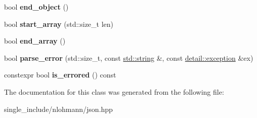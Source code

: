 \begin{DoxyCompactItemize}
\mbox{\label{classnlohmann_1_1detail_1_1json__sax__dom__callback__parser_ae75d313d6d1b9c29508e740a10fefa18}} 
bool {\bfseries end\+\_\+object} ()
\item 
\mbox{\label{classnlohmann_1_1detail_1_1json__sax__dom__callback__parser_a5255b98ba8282e3625968f91cff9d3d0}} 
bool {\bfseries start\+\_\+array} (std\+::size\+\_\+t len)
\item 
\mbox{\label{classnlohmann_1_1detail_1_1json__sax__dom__callback__parser_aa64e7a650952174037d32028de582c12}} 
bool {\bfseries end\+\_\+array} ()
\item 
\mbox{\label{classnlohmann_1_1detail_1_1json__sax__dom__callback__parser_aac6e64f0b59c9150cde974e182d5ecab}} 
bool {\bfseries parse\+\_\+error} (std\+::size\+\_\+t, const \hyperlink{namespacenlohmann_1_1detail_a1ed8fc6239da25abcaf681d30ace4985ab45cffe084dd3d20d928bee85e7b0f21}{std\+::string} \&, const \hyperlink{classnlohmann_1_1detail_1_1exception}{detail\+::exception} \&ex)
\item 
\mbox{\label{classnlohmann_1_1detail_1_1json__sax__dom__callback__parser_a167fd9bf385d3d08bcbbba8a927c0eff}} 
constexpr bool {\bfseries is\+\_\+errored} () const
\end{DoxyCompactItemize}


The documentation for this class was generated from the following file\+:\begin{DoxyCompactItemize}
\item 
single\+\_\+include/nlohmann/json.\+hpp\end{DoxyCompactItemize}

